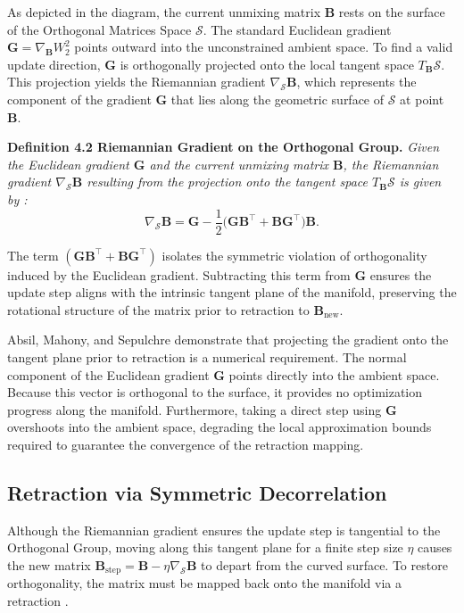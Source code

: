 \documentclass[12pt,a4paper,twoside,openany]{book}
\begin{document}
As depicted in the diagram, the current unmixing matrix $\mathbf{B}$ rests on the surface of the Orthogonal Matrices Space $\mathcal{S}$. 
The standard Euclidean gradient $\mathbf{G} = \nabla_{\mathbf{B}} W_2^2$ points outward into the unconstrained ambient space. 
To find a valid update direction, $\mathbf{G}$ is orthogonally projected onto the local tangent space $T_{\mathbf{B}}\mathcal{S}$. 
This projection yields the Riemannian gradient $\nabla_{\mathcal{S}} \mathbf{B}$, which represents the component of the gradient $\mathbf{G}$ 
that lies along the geometric surface of $\mathcal{S}$ at point $\mathbf{B}$.

\vspace{0.5em}
\noindent\textbf{Definition 4.2 Riemannian Gradient on the Orthogonal Group.} \textit{Given the Euclidean gradient $\mathbf{G}$ and the current unmixing matrix $\mathbf{B}$, 
the Riemannian gradient $\nabla_{\mathcal{S}} \mathbf{B}$ resulting from the projection onto the tangent space $T_{\mathbf{B}}\mathcal{S}$ 
is given by \cite[Chapter 3]{absil2008optimization}:}
\begin{equation}
    \nabla_{\mathcal{S}} \mathbf{B} = \mathbf{G} - \frac{1}{2}\big(\mathbf{G}\mathbf{B}^\top + \mathbf{B}\mathbf{G}^\top \big)\mathbf{B}.
\end{equation}
\vspace{0.5em}

The term $(\mathbf{G}\mathbf{B}^\top + \mathbf{B}\mathbf{G}^\top)$ isolates the symmetric violation of orthogonality induced 
by the Euclidean gradient. Subtracting this term from $\mathbf{G}$ ensures the update step aligns with the intrinsic tangent plane of 
the manifold, preserving the rotational structure of the matrix prior to retraction to $\mathbf{B}_{\text{new}}$.

Absil, Mahony, and Sepulchre \citeyear[Chapter 3 and 4]{absil2008optimization} demonstrate that projecting the gradient onto the tangent plane prior to 
retraction is a numerical requirement. The normal component of the Euclidean gradient $\mathbf{G}$ points directly into the ambient space. 
Because this vector is orthogonal to the surface, it provides no optimization progress along the manifold. 
Furthermore, taking a direct step using $\mathbf{G}$ overshoots into the ambient space, degrading the local approximation bounds required to 
guarantee the convergence of the retraction mapping.


\subsection{Retraction via Symmetric Decorrelation}
Although the Riemannian gradient ensures the update step is tangential to the Orthogonal Group, 
moving along this tangent plane for a finite step size $\eta$ causes the new matrix $\mathbf{B}_{\text{step}} = \mathbf{B} - \eta \nabla_{\mathcal{S}} \mathbf{B}$ 
to depart from the curved surface. To restore orthogonality, the matrix must be mapped back onto the manifold 
via a retraction \cite[Chapter 4]{absil2008optimization}.
\end{document}
